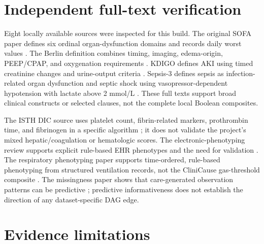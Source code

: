 \documentclass[10pt]{article}
\begin{document}
\section{Independent full-text verification}

Eight locally available sources were inspected for this build. The original SOFA
paper defines six ordinal organ-dysfunction domains and records daily worst values
\citep{vincent1996sofa}. The Berlin definition combines timing, imaging, edema-origin,
PEEP/CPAP, and oxygenation requirements \citep{berlin2012ards}. KDIGO defines AKI
using timed creatinine changes and urine-output criteria \citep{kdigo2012aki}.
Sepsis-3 defines sepsis as infection-related organ dysfunction and septic shock using
vasopressor-dependent hypotension with lactate above 2 mmol/L
\citep{singer2016sepsis3}. These full texts support broad clinical constructs or
selected clauses, not the complete local Boolean composites.

The ISTH DIC source uses platelet count, fibrin-related markers, prothrombin time, and
fibrinogen in a specific algorithm \citep{taylor2001dic}; it does not validate the
project's mixed hepatic/coagulation or hematologic scores. The electronic-phenotyping
review supports explicit rule-based EHR phenotypes and the need for validation
\citep{banda2018phenotyping}. The respiratory phenotyping paper supports
time-ordered, rule-based phenotyping from structured ventilation records, not the
CliniCause gas-threshold composite \citep{essay2020resp}. The missingness paper shows
that care-generated observation patterns can be predictive \citep{lipton2016missing};
predictive informativeness does not establish the direction of any dataset-specific
DAG edge.

\section{Evidence limitations}
\end{document}
